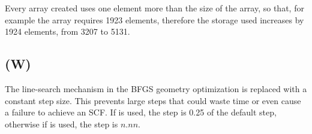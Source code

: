 Every array created uses one element more than the size of the
array, so that, for example the array  requires 1923
elements, therefore
the storage used increases by 1924 elements, from 3207 to 5131.


\subsection*{ (W)}

The line-search mechanism in the BFGS geometry optimization is replaced with
a constant step size.  This prevents large steps that could waste time or even
cause a failure to achieve an SCF.  If  is used, the step is 0.25 of the
default step, otherwise if  is used, the step is $n.nn$.

%

